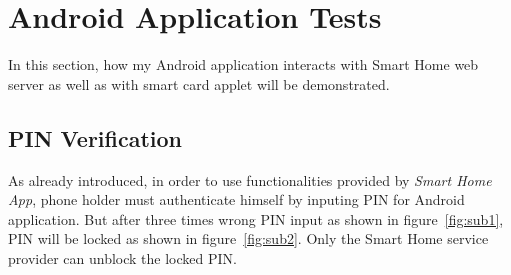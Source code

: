 \section{Android Application Tests}
In this section, how my Android application interacts with Smart Home web server as well as with smart card applet will be demonstrated.

\subsection{PIN Verification}

As already introduced, in order to use functionalities provided by \emph{Smart Home App}, phone holder must authenticate himself by inputing PIN for Android application. But after three times wrong PIN input as shown in figure~\ref{fig:sub1}, PIN will be locked as shown in figure~\ref{fig:sub2}. Only the Smart Home service provider can unblock the locked PIN. 
